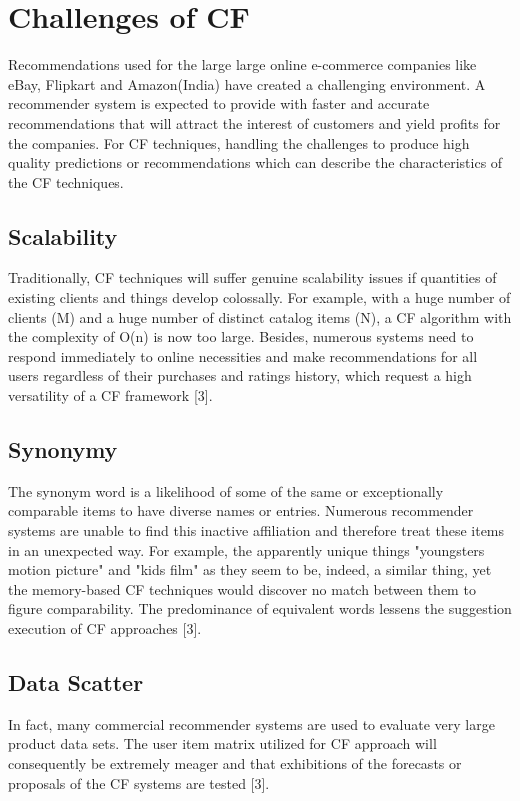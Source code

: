 \documentclass[10pt,conference]{IEEEtran}
\begin{document}
\section{Challenges of CF}
Recommendations used for the large large online e-commerce companies like eBay, Flipkart and Amazon(India) have created a challenging environment. A recommender system is expected to provide with faster and accurate recommendations that will attract the interest of customers and yield profits for the companies. For CF techniques, handling the challenges to produce high quality predictions or recommendations which can describe the characteristics of the CF techniques.

\subsection{Scalability}
Traditionally, CF techniques will suffer genuine scalability issues if quantities of existing clients and things develop colossally. For example, with a huge number of clients (M) and a huge number of distinct catalog items (N), a CF algorithm with the complexity of O(n) is now too large. Besides, numerous systems need to respond immediately to online necessities and make recommendations for all users regardless of their purchases and ratings history, which request a high versatility of a CF framework [3].

\subsection{Synonymy}
The synonym word is a likelihood of some of the same or exceptionally comparable items to have diverse names or entries. Numerous recommender systems are unable to find this inactive affiliation and therefore treat these items in an unexpected way. For example, the apparently unique things "youngsters motion picture" and "kids film" as they seem to be, indeed, a similar thing, yet the memory-based CF techniques would discover no match between them to figure comparability. The predominance of equivalent words lessens the suggestion execution of CF approaches [3].

\subsection{Data Scatter}
In fact, many commercial recommender systems are used to evaluate very large product data sets. The user item matrix utilized for CF approach will consequently be extremely meager and that exhibitions of the forecasts or proposals of the CF systems are tested [3].
\end{document}
